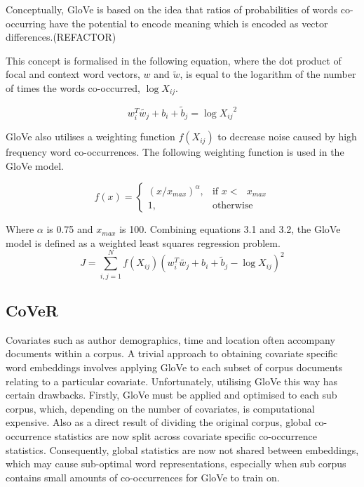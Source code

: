 Conceptually, GloVe is based on the idea that ratios of probabilities of words co-occurring have the potential to encode meaning which is encoded as vector differences.(REFACTOR)

This concept is formalised in the following equation, where the dot product of focal and context word vectors, \(w\) and \(\tilde{w}\), is equal to the logarithm of the number of times the words co-occurred, \(\log{X_{ij}}\).

\begin{equation}
w_{i}^{T} \tilde{w_{j}} + b_{i} + \tilde{b}_{j} = \log{X_{ij}}^{2}
\end{equation}

\noindent
\newline
GloVe also utilises a weighting function \(f(X_{ij})\) to decrease noise caused by high frequency word co-occurrences. The following weighting function is used in the GloVe model.

\begin{equation}
	f(x) =
	\begin{cases}
	(x/x_{max})^{\alpha}, & \text{if  \(x <\) } x_{max} \\
	1, & \text{otherwise}
	\end{cases}
\end{equation}

\noindent
\newline
Where \( \alpha \) is 0.75 and \(x_{max}\) is 100. Combining equations 3.1 and 3.2, the GloVe model is defined as a weighted least squares regression problem.
\begin{equation}
	J = \sum_{i, j=1}^{N} f(X_{ij}) (w_{i}^{T} \tilde{w_{j}} + b_{i} + \tilde{b}_{j} - \log{X_{ij}})^{2}
\end{equation}
\subsection{CoVeR}
Covariates such as author demographics, time and location often accompany documents within a corpus. A trivial approach to obtaining covariate specific word embeddings involves applying GloVe to each subset of corpus documents relating to a particular covariate. Unfortunately, utilising GloVe this way has certain drawbacks. Firstly, GloVe must be applied and optimised to each sub corpus, which, depending on the number of covariates, is computational expensive. Also as a direct result of dividing the original corpus, global co-occurrence statistics are now split across covariate specific co-occurrence statistics. Consequently, global statistics are now not shared between embeddings, which may cause sub-optimal word representations, especially when sub corpus contains small amounts of co-occurrences for GloVe to train on. 

